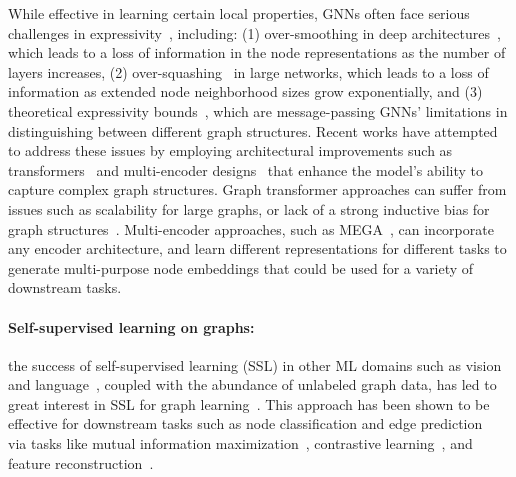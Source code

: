 \documentclass{article}
\begin{document}
While effective in learning certain local properties, GNNs often face serious challenges in expressivity~\cite{xu2018powerful}, including: (1) over-smoothing in deep architectures~\cite{rusch2023survey}, which leads to a loss of information in the node representations as the number of layers increases, (2) over-squashing~\cite{topping2021understanding} in large networks, which leads to a loss of information as extended node neighborhood sizes grow exponentially, and (3) theoretical expressivity bounds~\cite{xu2018powerful}, which are message-passing GNNs' limitations in distinguishing between different graph structures. Recent works have attempted to address these issues by employing architectural improvements such as transformers~\cite{rampavsek2022recipe} and multi-encoder designs~\cite{khoshbakhtian2024mega} that enhance the model's ability to capture complex graph structures. Graph transformer approaches can suffer from issues such as scalability for large graphs, or lack of a strong inductive bias for graph structures~\cite{ma2023graph}. Multi-encoder approaches, such as MEGA~\cite{khoshbakhtian2024mega}, can incorporate any encoder architecture, and learn different representations for different tasks to generate multi-purpose node embeddings that could be used for a variety of downstream tasks.



\paragraph{Self-supervised learning on graphs:} the success of self-supervised learning (SSL) in other ML domains such as vision~\cite{2021baobeit} and language~\cite{radford2019language}, coupled with the abundance of unlabeled graph data, has led to great interest in SSL for graph learning~\cite{khoshbakhtian2024mega,ju2022multi,velivckovicdeep,zhang2021canonical,jin2021automated}. This approach has been shown to be effective for downstream tasks such as node classification and edge prediction~\cite{liu2022graph,velivckovicdeep,khoshbakhtian2024mega,ermolov2021whitening} via tasks like mutual information maximization~\cite{you2020graph}, contrastive learning~\cite{you2020graph}, and feature reconstruction~\cite{hou2022graphmae}. 
\end{document}
